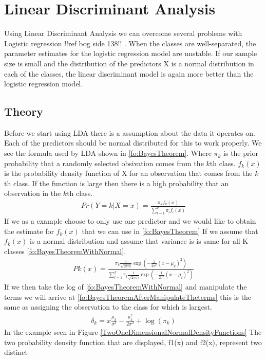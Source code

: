 \section{Linear Discriminant Analysis}
Using Linear Discriminant Analysis we can overcome several problems with Logistic regression {  !!ref bog side 138!! }. When the classes are well-separated, the parameter estimates for the
logistic regression model are unstable. If our sample size is small and the distribution of the predictors X is a normal distribution in each of the classes, the linear discriminant model is again more better than the logistic regression model.
\subsection{Theory}
Before we start using LDA there is a  assumption about the data it operates on. Each of the predictors should be normal distributed for this to work properly. We see the formula used by LDA shown in \ref{fo:BayesTheorem}. Where $\pi_k$ is the prior probability that a randomly selected obsivation comes from the $k$th class. $f_k(x)$ is the probability density function of X for an observation that comes from the $k$th class. If the function is large then there is a high probability that an observation in the $k$th class.
\begin{align}\label{fo:BayesTheorem}
Pr(Y=k|X=x) = \frac{\pi_k f_k(x)}{ \sum_{l=1}^{k}\pi_l f_l(x) }
\end{align}
If we as a example choose to only use one predictor and we would like to obtain the estimate for $f_k(x)$ that we can use in \ref{fo:BayesTheorem} If we assume that $f_k(x)$ is a normal distribution and assume that variance is is same for all K classes \ref{fo:BayesTheoremWithNormal}.
\begin{align}\label{fo:BayesTheoremWithNormal}
Pk(x) = \frac{\pi_k \frac{1}{\sqrt{2\pi\sigma)}}\exp(-\frac{1}{2\sigma^2}(x-\mu_k)^2)}{ \sum_{l=1}^{k}\pi_l \frac{1}{\sqrt{2\pi\sigma)}}\exp(-\frac{1}{2\sigma^2}(x-\mu_l)^2) }
\end{align}
If we then take the log of \ref{fo:BayesTheoremWithNormal} and manipulate the terms we will arrive at \ref{fo:BayesTheoremAfterManipulateTheterms} this is the same as assigning the observation to the class for which is largest.
\begin{align}\label{fo:BayesTheoremAfterManipulateTheterms}
\delta_k = x\frac{\mu_k}{\sigma^2} - \frac{\mu^2_k}{2 \sigma^2} + \log(\pi_k)
\end{align}
In the example seen in Figure \ref{TwoOneDimensionalNormalDensityFunctions} The two probability density function that are displayed, f1(x) and f2(x), represent two distinct
